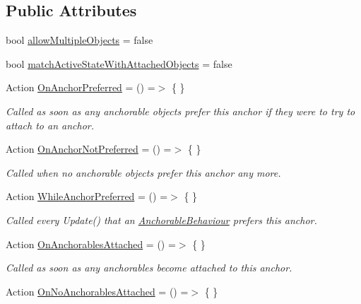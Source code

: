 \subsection*{Public Attributes}
\begin{DoxyCompactItemize}
\item 
bool \mbox{\hyperlink{class_leap_1_1_unity_1_1_interaction_1_1_anchor_ad0581637844a848f9e8948a48abfc77d}{allow\+Multiple\+Objects}} = false
\item 
bool \mbox{\hyperlink{class_leap_1_1_unity_1_1_interaction_1_1_anchor_ab0e29c02f3673a8b43bb2ac49e2d8c25}{match\+Active\+State\+With\+Attached\+Objects}} = false
\item 
Action \mbox{\hyperlink{class_leap_1_1_unity_1_1_interaction_1_1_anchor_aa38b7abb27aec5bc6b81b417f735d572}{On\+Anchor\+Preferred}} = () =$>$ \{ \}
\begin{DoxyCompactList}\small\item\em Called as soon as any anchorable objects prefer this anchor if they were to try to attach to an anchor. \end{DoxyCompactList}\item 
Action \mbox{\hyperlink{class_leap_1_1_unity_1_1_interaction_1_1_anchor_a6ab1aee0208ab327529f22fc6d54aecc}{On\+Anchor\+Not\+Preferred}} = () =$>$ \{ \}
\begin{DoxyCompactList}\small\item\em Called when no anchorable objects prefer this anchor any more. \end{DoxyCompactList}\item 
Action \mbox{\hyperlink{class_leap_1_1_unity_1_1_interaction_1_1_anchor_a98e0e252c0ef198399129d56f2586061}{While\+Anchor\+Preferred}} = () =$>$ \{ \}
\begin{DoxyCompactList}\small\item\em Called every Update() that an \mbox{\hyperlink{class_leap_1_1_unity_1_1_interaction_1_1_anchorable_behaviour}{Anchorable\+Behaviour}} prefers this anchor. \end{DoxyCompactList}\item 
Action \mbox{\hyperlink{class_leap_1_1_unity_1_1_interaction_1_1_anchor_a967d19ba4ff0dfb898679a7903845d26}{On\+Anchorables\+Attached}} = () =$>$ \{ \}
\begin{DoxyCompactList}\small\item\em Called as soon as any anchorables become attached to this anchor. \end{DoxyCompactList}\item 
Action \mbox{\hyperlink{class_leap_1_1_unity_1_1_interaction_1_1_anchor_a5c735581eb8e1e360c0d46accfa5c38e}{On\+No\+Anchorables\+Attached}} = () =$>$ \{ \}

\end{DoxyCompactItemize}
